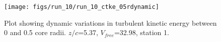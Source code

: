 \begin{figure}[H]
\centering
\texttt{[image: figs/run\_10/run\_10\_ctke\_05rdynamic]}
\caption{Plot showing dynamic variations in turbulent kinetic energy between 0 and 0.5 core radii. $z/c$=5.37, $V_{free}$=32.98, station 1.}
\label{fig:run_10_ctke_05rdynamic}
\end{figure}


